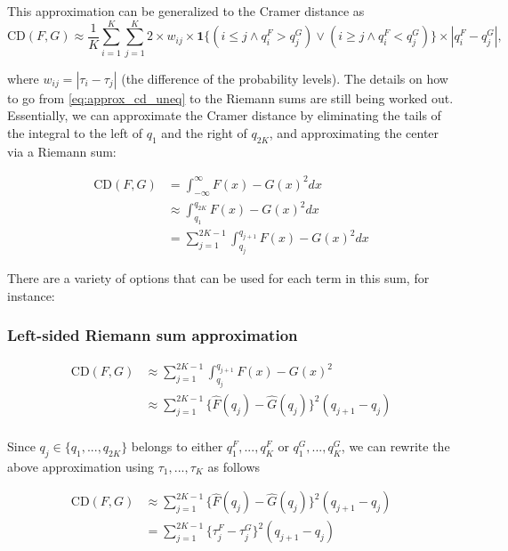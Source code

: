 \documentclass[
]{article}
\begin{document}
This approximation can be generalized to the Cramer distance as
\begin{equation}
\text{CD}(F, G) \approx \frac{1}{K}\sum_{i = 1}^K\sum_{j = 1}^K 2 \times w_{ij} \times \mathbf{1}\{(i \leq j \land q^F_i > q^G_j) \lor (i \geq j \land q^F_i < q^G_j)\} \times \left| q^F_i - q^G_j\right|, \label{eq:approx_cd_uneq}
\end{equation}

where \(w_{ij}=|\tau_i-\tau_j|\) (the difference of the probability
levels). The details on how to go from \eqref{eq:approx_cd_uneq} to the
Riemann sums are still being worked out. Essentially, we can approximate
the Cramer distance by eliminating the tails of the integral to the left
of \(q_1\) and the right of \(q_{2K}\), and approximating the center via
a Riemann sum:

\begin{align}
\text{CD}(F,G) &=\int^\infty_{-\infty}{F(x)−G(x)}^2dx\\
&\approx \int^{q_{2K}}_{q_1}{F(x)−G(x)}^2dx\\
&=\sum^{2K-1}_{j=1}\int^{q_{j+1}}_{q_j}{F(x)−G(x)}^2dx
\end{align}

There are a variety of options that can be used for each term in this
sum, for instance:

\hypertarget{left-sided-riemann-sum-approximation}{%
\subsubsection{Left-sided Riemann sum
approximation}\label{left-sided-riemann-sum-approximation}}

\begin{align}
\text{CD}(F,G) &\approx\sum^{2K-1}_{j=1}\int^{q_{j+1}}_{q_j}{F(x)−G(x)}^2\\
&\approx\sum^{2K-1}_{j=1}\{\hat{F}(q_j)-\hat{G}(q_j)\}^2(q_{j+1}-q_{j})\\
\end{align}

Since \(q_j\in \{q_1, ..., q_{2K}\}\) belongs to either
\(q_{1}^F,...,q_{K}^F\) or \(q_{1}^G,...,q_{K}^G\), we can rewrite the
above approximation using \(\tau_1,...,\tau_K\) as follows

\begin{align}
\text{CD}(F,G) 
&\approx\sum^{2K-1}_{j=1}\{\hat{F}(q_j)-\hat{G}(q_j)\}^2(q_{j+1}-q_{j})\\
&=\sum^{2K-1}_{j=1}\{\tau^F_j-\tau^G_j\}^2(q_{j+1}-q_{j})
\end{align}
\end{document}
